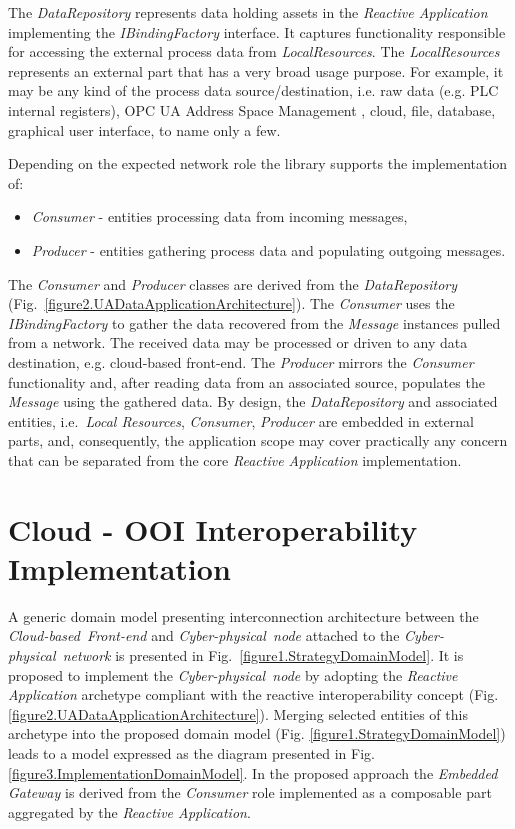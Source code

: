 \documentclass[runningheads]{llncs}
\begin{document}
The \emph{DataRepository} represents data holding assets in the \emph{Reactive Application} implementing the \emph{IBindingFactory} interface. It captures functionality responsible for accessing the external process data from \emph{LocalResources}. The \emph{LocalResources} represents an external part that has a very broad usage purpose. For example, it may be any kind of the process data source/destination, i.e. raw data (e.g. PLC internal registers), OPC UA Address Space Management \cite{mpostol2020}, cloud, file, database, graphical user interface, to name only a few.

Depending on the expected network role the library supports the implementation of:

\begin{itemize}
      \item \emph{Consumer} - entities processing data from incoming messages,
      \item \emph{Producer} - entities gathering process data and populating outgoing messages.
\end{itemize}

The \emph{Consumer} and \emph{Producer} classes are derived from the \emph{DataRepository} (Fig.~\ref{figure2.UADataApplicationArchitecture}). The \emph{Consumer} uses the \emph{IBindingFactory} to gather the data recovered from the \emph{Message} instances pulled from a network. The received data may be processed or driven to any data destination, e.g. cloud-based front-end. The \emph{Producer} mirrors the \emph{Consumer} functionality and, after reading data from an associated source, populates the \emph{Message} using the gathered data. By design, the \emph{DataRepository} and associated entities, i.e.~\emph{Local Resources}, \emph{Consumer}, \emph{Producer} are embedded in external parts, and, consequently, the application scope may cover practically any concern that can be separated from the core \emph{Reactive Application} implementation.

\section{Cloud - OOI Interoperability Implementation}\label{section.gateway-implementation}

\begin{proposition}
      A generic domain model presenting interconnection architecture between the \emph{Cloud-based\ Front-end} and \emph{Cyber-physical\ node} attached to the \emph{Cyber-physical\ network} is presented in Fig.~\ref{figure1.StrategyDomainModel}. It is proposed to implement the \emph{Cyber-physical\ node} by adopting the \emph{Reactive Application} archetype compliant with the reactive interoperability concept (Fig. \ref{figure2.UADataApplicationArchitecture}). Merging selected entities of this archetype into the proposed domain model (Fig. \ref{figure1.StrategyDomainModel}) leads to a model expressed as the diagram presented in Fig. \ref{figure3.ImplementationDomainModel}. In the proposed approach the \emph{Embedded Gateway} is derived from the \emph{Consumer} role implemented as a composable part aggregated by the \emph{Reactive Application}.
\end{proposition}
\end{document}
